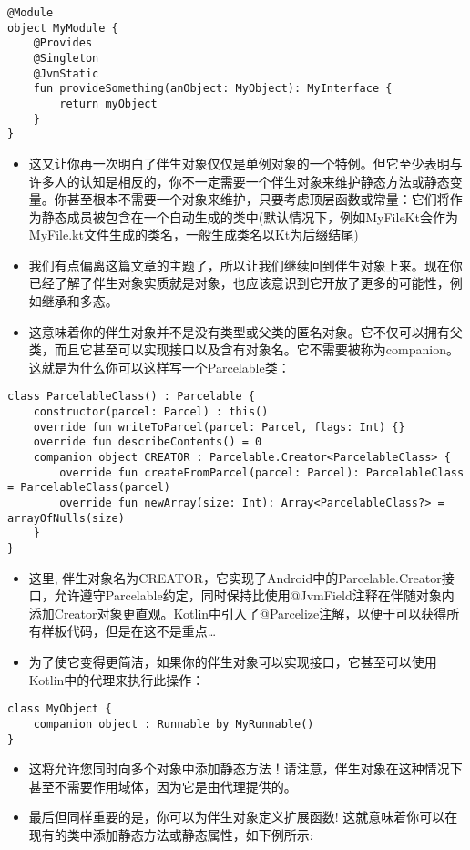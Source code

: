 \documentclass[9pt, b5paper]{article}
\begin{document}
\begin{verbatim}
@Module
object MyModule {
    @Provides
    @Singleton
    @JvmStatic
    fun provideSomething(anObject: MyObject): MyInterface {
        return myObject
    }
}
\end{verbatim}
\begin{itemize}
\item 这又让你再一次明白了伴生对象仅仅是单例对象的一个特例。但它至少表明与许多人的认知是相反的，你不一定需要一个伴生对象来维护静态方法或静态变量。你甚至根本不需要一个对象来维护，只要考虑顶层函数或常量：它们将作为静态成员被包含在一个自动生成的类中(默认情况下，例如MyFileKt会作为MyFile.kt文件生成的类名，一般生成类名以Kt为后缀结尾)
\item 我们有点偏离这篇文章的主题了，所以让我们继续回到伴生对象上来。现在你已经了解了伴生对象实质就是对象，也应该意识到它开放了更多的可能性，例如继承和多态。
\item 这意味着你的伴生对象并不是没有类型或父类的匿名对象。它不仅可以拥有父类，而且它甚至可以实现接口以及含有对象名。它不需要被称为companion。这就是为什么你可以这样写一个Parcelable类：
\end{itemize}
\begin{verbatim}
class ParcelableClass() : Parcelable {
    constructor(parcel: Parcel) : this()
    override fun writeToParcel(parcel: Parcel, flags: Int) {}
    override fun describeContents() = 0
    companion object CREATOR : Parcelable.Creator<ParcelableClass> {
        override fun createFromParcel(parcel: Parcel): ParcelableClass = ParcelableClass(parcel)
        override fun newArray(size: Int): Array<ParcelableClass?> = arrayOfNulls(size)
    }
}
\end{verbatim}
\begin{itemize}
\item 这里, 伴生对象名为CREATOR，它实现了Android中的Parcelable.Creator接口，允许遵守Parcelable约定，同时保持比使用@JvmField注释在伴随对象内添加Creator对象更直观。Kotlin中引入了@Parcelize注解，以便于可以获得所有样板代码，但是在这不是重点\ldots{}
\item 为了使它变得更简洁，如果你的伴生对象可以实现接口，它甚至可以使用Kotlin中的代理来执行此操作：
\end{itemize}
\begin{verbatim}
class MyObject {
    companion object : Runnable by MyRunnable()
}
\end{verbatim}
\begin{itemize}
\item 这将允许您同时向多个对象中添加静态方法！请注意，伴生对象在这种情况下甚至不需要作用域体，因为它是由代理提供的。
\item 最后但同样重要的是，你可以为伴生对象定义扩展函数! 这就意味着你可以在现有的类中添加静态方法或静态属性，如下例所示:
\end{itemize}
\end{document}
